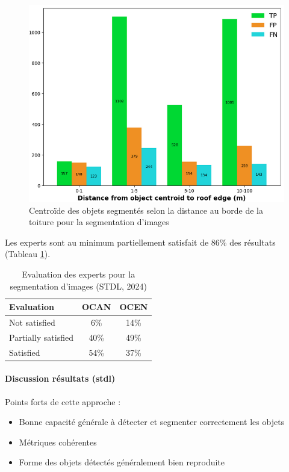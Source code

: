 \begin{figure}[H]
    \centering
    \includegraphics[width=1\linewidth]{02-main//figures/ch2/stdl_11_segmentation_image_distance.png}
    \caption{Centroïde des objets segmentés selon la distance au borde de la toiture pour la segmentation d’images  \cite{herny_detection_2024}}
    \label{fig:stdl_11_segmentation_image_distance}
\end{figure}

Les experts sont au minimum partiellement satisfait de 86\% des résultats (Tableau \ref{tab:stdl_07_segmentation_image_resultats_experts}).
\begin{table}[H]
    \centering
    \begin{tabular}{|l|c|c|}
    \hline
    Evaluation & OCAN & OCEN \\
    \hline
    Not satisfied & 6\% & 14\% \\
    Partially satisfied & 40\% & 49\% \\
    Satisfied & 54\% & 37\% \\
    \hline
    \end{tabular}
    \caption{Evaluation des experts pour la segmentation d'images (STDL, 2024)}
    \label{tab:stdl_07_segmentation_image_resultats_experts}
\end{table}
\newpage
\paragraph{Discussion résultats (\acrshort{stdl})}

\par{Points forts de cette approche :}
\begin{itemize}
\item Bonne capacité générale à détecter et segmenter correctement les objets
\item Métriques cohérentes
\item Forme des objets détectés généralement bien reproduite
\end{itemize}

